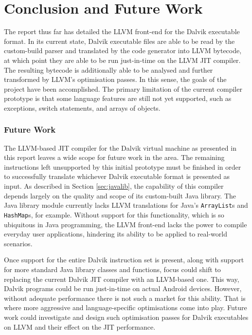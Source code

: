 \chapter{Conclusion and Future Work}
\label{chap:conclusion}

The report thus far has detailed the LLVM front-end for the Dalvik executable format. In its current state, Dalvik executable files are able to be read by the custom-build parser and translated by the code generator into LLVM bytecode, at which point they are able to be run just-in-time on the LLVM JIT compiler. The resulting bytecode is additionally able to be analysed and further transformed by LLVM's optimisation passes. In this sense, the goals of the project have been accomplished. The primary limitation of the current compiler prototype is that some language features are still not yet supported, such as exceptions, switch statements, and arrays of objects.

\subsection*{Future Work}

The LLVM-based JIT compiler for the Dalvik virtual machine as presented in this report leaves a wide scope for future work in the area. The remaining instructions left unsupported by this initial prototype must be finished in order to successfully translate whichever Dalvik executable format is presented as input. As described in Section \ref{sec:javalib}, the capability of this compiler depends largely on the quality and scope of its custom-built Java library. The Java library module currently lacks LLVM translations for Java's \verb|ArrayList|s and \verb|HashMap|s, for example. Without support for this functionality, which is so ubiquitous in Java programming, the LLVM front-end lacks the power to compile everyday user applications, hindering its ability to be applied to real-world scenarios.

Once support for the entire Dalvik instruction set is present, along with support for more standard Java library classes and functions, focus could shift to replacing the current Dalvik JIT compiler with an LLVM-based one. This way, Dalvik programs could be run just-in-time on actual Android devices. However, without adequate performance there is not such a market for this ability. That is where more aggressive and language-specific optimisations come into play. Future work could investigate and design such optimisation passes for Dalvik executables on LLVM and their effect on the JIT performance.
